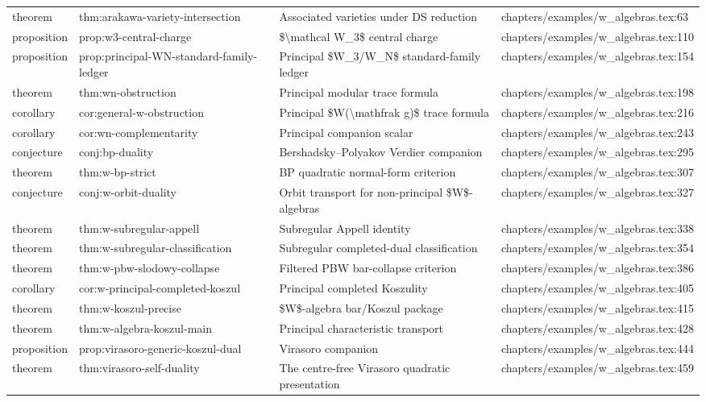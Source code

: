 \documentclass[11pt]{article}
\begin{document}
\begin{longtable}{L{0.10\textwidth}L{0.26\textwidth}L{0.42\textwidth}L{0.22\textwidth}}
theorem & thm:arakawa-variety-intersection & Associated varieties under DS reduction & chapters/examples/w\_algebras.tex:63\\
proposition & prop:w3-central-charge & \$\textbackslash{}mathcal W\_3\$ central charge & chapters/examples/w\_algebras.tex:110\\
proposition & prop:principal-WN-standard-family-led{}ger & Principal \$W\_3/W\_N\$ standard-family led{}ger & chapters/examples/w\_algebras.tex:154\\
theorem & thm:wn-obstruction & Principal modular trace formula & chapters/examples/w\_algebras.tex:198\\
corollary & cor:general-w-obstruction & Principal \$W(\textbackslash{}mathfrak g)\$ trace formula & chapters/examples/w\_algebras.tex:216\\
corollary & cor:wn-complementarity & Principal companion scalar & chapters/examples/w\_algebras.tex:243\\
conjecture & conj:bp-duality & Bershadsky--Polyakov Verdier companion & chapters/examples/w\_algebras.tex:295\\
theorem & thm:w-bp-strict & BP quadratic normal-form criterion & chapters/examples/w\_algebras.tex:307\\
conjecture & conj:w-orbit-duality & Orbit transport for non-principal \$W\$-algebras & chapters/examples/w\_algebras.tex:327\\
theorem & thm:w-subregular-appell & Subregular Appell identity & chapters/examples/w\_algebras.tex:338\\
theorem & thm:w-subregular-classification & Subregular completed-dual classification & chapters/examples/w\_algebras.tex:354\\
theorem & thm:w-pbw-slodowy-collapse & Filtered PBW bar-collapse criterion & chapters/examples/w\_algebras.tex:386\\
corollary & cor:w-principal-completed-koszul & Principal completed Koszulity & chapters/examples/w\_algebras.tex:405\\
theorem & thm:w-koszul-precise & \$W\$-algebra bar/Koszul package & chapters/examples/w\_algebras.tex:415\\
theorem & thm:w-algebra-koszul-main & Principal characteristic transport & chapters/examples/w\_algebras.tex:428\\
proposition & prop:virasoro-generic-koszul-dual & Virasoro companion & chapters/examples/w\_algebras.tex:444\\
theorem & thm:virasoro-self-duality & The centre-free Virasoro quadratic presentation & chapters/examples/w\_algebras.tex:459\\

\end{longtable}
\end{document}

